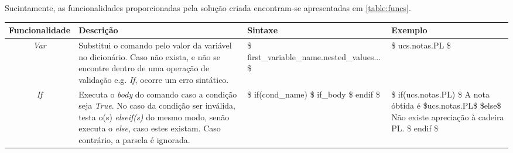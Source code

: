 \documentclass[../relatorio.tex]{subfiles}
\begin{document}
    Sucintamente, as funcionalidades proporcionadas pela 
    solução criada encontram-se apresentadas em \ref{table:funcs}.
    \begin{landscape}
        \centering
        \begin{table}[!ht]
            \begin{tabular}{|c|p{7cm}|p{6cm}|p{7cm}|}
                \hline
                Funcionalidade      
                & 
                \centering
                Descrição           
                & 
                \centering
                Sintaxe             
                & 
                Exemplo 
                \\
                \hline
                \textit{Var}        
                &
                Substitui o comando pelo valor 
                da variável no dicionário.
                Caso não exista, e não se encontre
                dentro de uma operação de validação 
                e.g. \textit{If}, ocorre um erro 
                sintático.
                &
                \$ first\_variable\_name.nested\_values... \$
                &
                \$ ucs.notas.PL \$
                \\
                \hline
                \textit{If}
                &
                Executa o \textit{body} do
                comando caso a condição seja \textit{True}.
                No caso da condição ser inválida, testa o(s)
                \textit{elseif(s)} do mesmo modo,
                senão executa o \textit{else}, caso estes 
                existam.                                \newline
                Caso contrário, a parsela é ignorada.
                &
                \$ if(cond\_name) \$                    \newline
                    if\_body                            \newline
                \$ endif \$                             \newline
                &
                \$ if(ucs.notas.PL) \$                  \newline
                    A nota óbtida é \$ucs.notas.PL\$    \newline
                    \$else\$                            \newline
                    Não existe apreciação à cadeira PL. \newline
                \$ endif \$                             \newline

\end{tabular}
\end{table}
\end{landscape}
\end{document}

